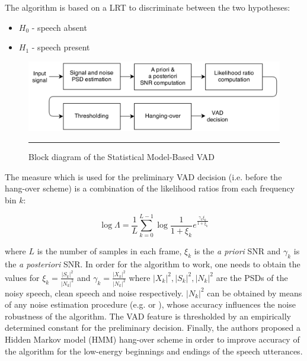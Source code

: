 The algorithm is based on a LRT to discriminate between the two hypotheses:
\begin{itemize}
\item[] $H_0$ - speech absent
\item[] $H_1$ - speech present
\end{itemize}

\begin{figure}[htbp]
	\centering
		\includegraphics[width=0.9\columnwidth]{Figures/Chapter2/Sohn.png}
		\rule{37em}{0.5pt}
	\caption[Block diagram of the Statistical Model-Based VAD]{Block diagram of the Statistical Model-Based VAD \cite{Sohn}}
	\label{fig:Sohn}
\end{figure}

The measure which is used for the preliminary VAD decision (i.e. before the hang-over scheme) is a combination of the likelihood ratios from each frequency bin $k$:

\begin{equation}
\log \Lambda = \frac{1}{L} \sum_{k=0}^{L-1} \log \frac{1}{1+\xi_k} e^{\frac{\gamma_k\xi_k}{1+\xi_k}}
\end{equation}

where $L$ is the number of samples in each frame, $\xi_k$ is the \emph{a priori} SNR and $\gamma_k$ is the \emph{a posteriori} SNR. In order for the algorithm to work, one needs to obtain the values for $\xi_k = \frac{\left | S_k \right |^{2}}{\left | N_k \right |^{2}}$ and $\gamma_k = \frac{\left | X_k \right |^{2}}{\left | N_k \right |^{2}}$ where $\left | X_k \right |^{2}, \left | S_k \right |^{2}, \left | N_k \right |^{2}$ are the PSDs of the noisy speech, clean speech and noise respectively. $\left | N_k \right |^{2}$ can be obtained by means of any noise estimation procedure (e.g. \cite{MSnoise} or \cite{MMSEnoise}), whose accuracy influences the noise robustness of the algorithm. The VAD feature is thresholded by an empirically determined constant for the preliminary decision. Finally, the authors proposed a Hidden Markov model (HMM) hang-over scheme in order to improve accuracy of the algorithm for the low-energy beginnings and endings of the speech utterances.

